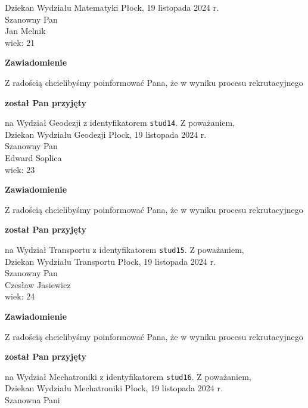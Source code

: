 \documentclass[12pt,a4paper]{article}
\begin{document}
Dziekan
Wydziału Matematyki
\newpage
\hfill Płock, 19 listopada 2024 r. \\
\noindent
Szanowny Pan \\
Jan Melnik \\
wiek: 21
\bigskip
\begin{center}
    {\Large\textbf{Zawiadomienie}}
\end{center}
\bigskip 
Z radością chcielibyśmy poinformować Pana, że w wyniku procesu rekrutacyjnego
\begin{center}
\textsf{\textbf{został Pan przyjęty}}
\end{center}
na Wydział Geodezji z identyfikatorem \verb|stud14|. 
\vspace{2cm}
\noindent
Z poważaniem, \\
Dziekan
Wydziału Geodezji
\newpage
\hfill Płock, 19 listopada 2024 r. \\
\noindent
Szanowny Pan \\
Edward Soplica \\
wiek: 23
\bigskip
\begin{center}
    {\Large\textbf{Zawiadomienie}}
\end{center}
\bigskip 
Z radością chcielibyśmy poinformować Pana, że w wyniku procesu rekrutacyjnego
\begin{center}
\textsf{\textbf{został Pan przyjęty}}
\end{center}
na Wydział Transportu z identyfikatorem \verb|stud15|. 
\vspace{2cm}
\noindent
Z poważaniem, \\
Dziekan
Wydziału Transportu
\newpage
\hfill Płock, 19 listopada 2024 r. \\
\noindent
Szanowny Pan \\
Czesław Jasiewicz \\
wiek: 24
\bigskip
\begin{center}
    {\Large\textbf{Zawiadomienie}}
\end{center}
\bigskip 
Z radością chcielibyśmy poinformować Pana, że w wyniku procesu rekrutacyjnego
\begin{center}
\textsf{\textbf{został Pan przyjęty}}
\end{center}
na Wydział Mechatroniki z identyfikatorem \verb|stud16|. 
\vspace{2cm}
\noindent
Z poważaniem, \\
Dziekan
Wydziału Mechatroniki
\newpage
\hfill Płock, 19 listopada 2024 r. \\
\noindent
Szanowna Pani \\
\end{document}
